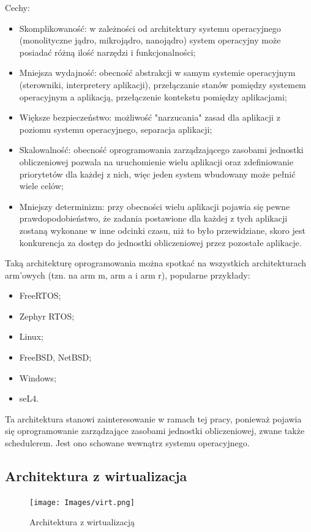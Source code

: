 \documentclass[../../main]{subfiles}
\begin{document}
Cechy:
\begin{itemize}
    \item Skomplikowaność: w zależności od architektury systemu operacyjnego (monolityczne jądro,
    mikrojądro, nanojądro) system operacyjny może posiadać różną ilość narzędzi i funkcjonalności;
    \item Mniejsza wydajność: obecność abstrakcji w samym systemie operacyjnym (sterowniki,
    interpretery aplikacji), przełączanie stanów pomiędzy systemem operacyjnym a aplikacją,
    przełączenie kontekstu pomiędzy aplikacjami;
    \item Większe bezpieczeństwo: możliwość "narzucania" zasad dla aplikacji z poziomu systemu
    operacyjnego, separacja aplikacji;
    \item Skalowalność: obecność oprogramowania zarządzającego zasobami jednostki obliczeniowej pozwala
    na uruchomienie wielu aplikacji oraz zdefiniowanie priorytetów dla każdej z nich, więc jeden
    system wbudowany może pełnić wiele celów;
    \item Mniejszy determinizm: przy obecności wielu aplikacji pojawia się pewne prawdopodobieństwo,
    że zadania postawione dla każdej z tych aplikacji zostaną wykonane w inne odcinki czasu, niż to
    było przewidziane, skoro jest konkurencja za dostęp do jednostki obliczeniowej przez pozostałe
    aplikacje.
\end{itemize}

Taką architekturę oprogramowania można spotkać na wszystkich architekturach \acrshort{arm}'owych (tzn.
na \acrshort{arm} \acrshort{m}, \acrshort{arm} \acrshort{a} i \acrshort{arm} \acrshort{r}), popularne
przykłady:

\begin{itemize}
    \item FreeRTOS;
    \item Zephyr RTOS;
    \item Linux;
    \item FreeBSD, NetBSD;
    \item Windows;
    \item seL4.
\end{itemize}

Ta architektura stanowi zainteresowanie w ramach tej pracy, ponieważ pojawia się oprogramowanie
zarządzające zasobami jednostki obliczeniowej, zwane także schedulerem. Jest ono schowane wewnątrz
systemu operacyjnego.

\subsection{Architektura z wirtualizacja}
\begin{figure}[h]
    \centering
    \texttt{[image: Images/virt.png]}
    \caption{Architektura z wirtualizacją}
    \label{fig:virt}
\end{figure}
\end{document}
